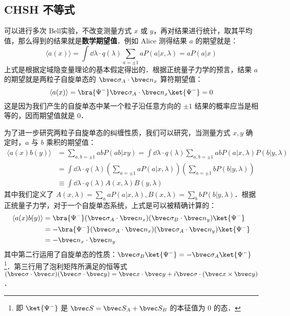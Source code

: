 \subsection{CHSH 不等式}
可以进行多次 Bell实验，不改变测量方式 $x$ 或 $y$，再对结果进行统计，取其平均值，那么得到的结果就是\textbf{数学期望值}．例如 Alice 测得结果 $a$ 的期望就是：
\begin{equation}
\langle a(x) \rangle =\int \dd \lambda \cdot q(\lambda) \sum_{a=\pm 1}a P(a|x,\lambda) = a P(a|x)
\end{equation}
上式是根据定域隐变量理论的基本假定得出的．根据正统量子力学的预言，结果 $a$ 的期望就是两粒子自旋单态的 $\bvec \sigma_A\cdot \bvec n_x$ 算符期望值：
\begin{equation}
\langle a(x)\rangle = \bra{\Psi^-} \bvec \sigma_A \cdot \bvec n_x \ket{\Psi^-} = 0
\end{equation}
这是因为我们产生的自旋单态中某一个粒子沿任意方向的 $\pm 1$ 结果的概率应当是相等的，因而期望值就是 $0$．

为了进一步研究两粒子自旋单态的纠缠性质，我们可以研究，当测量方式 $x,y$ 确定时，$a$ 与 $b$ 乘积的期望值：
\begin{equation}\label{chsh_eq1}
\begin{aligned}
\langle a(x)b(y)\rangle &= \sum_{a,b=\pm 1} ab P(ab|xy)=\int \dd\lambda \cdot q(\lambda) \sum_{a,b=\pm 1}abP(a|x,\lambda)P(b|y,\lambda)\\
&=\int \dd\lambda \cdot q(\lambda) \left(\sum_{a=\pm 1}aP(a|x,\lambda)\right)\left(\sum_{a=\pm 1}bP(b|y,\lambda)\right)\\
&\equiv \int \dd\lambda\cdot q(\lambda) A(x,\lambda) B(y,\lambda)
\end{aligned}
\end{equation}
其中我们定义了 $A(x,\lambda)=\sum_a aP(a|x,\lambda),B(x,\lambda)=\sum_b bP(b|y,\lambda)$．根据正统量子力学，对于一个自旋单态系统，上式是可以被精确计算的：
\begin{equation}
\begin{aligned}
\langle a(x)b(y)\rangle &= \bra{\Psi^-} (\bvec \sigma_A\cdot \bvec n_x)(\bvec \sigma_B\cdot \bvec n_y)\ket{\Psi^-}\\
&=-\bra{\Psi^-} (\bvec \sigma_A\cdot \bvec n_x)(\bvec \sigma_A\cdot \bvec n_y)\ket{\Psi^-}\\
&=-\bvec n_x\cdot \bvec n_y
\end{aligned}
\end{equation}
其中第二行运用了自旋单态的性质：$\bvec \sigma_B\ket{\Psi^-}=-\bvec \sigma_A\ket{\Psi^-}$ \footnote{即 $\ket{\Psi^-}$  是 $\bvec S=\bvec S_A+\bvec S_B$ 的本征值为 $0$ 的态．}．第三行用了泡利矩阵所满足的恒等式 $(\bvec \sigma \cdot \bvec x)(\bvec \sigma\cdot \bvec y)=\bvec x\cdot \bvec y+i\bvec \sigma\cdot (\bvec x\times \bvec y)$．

